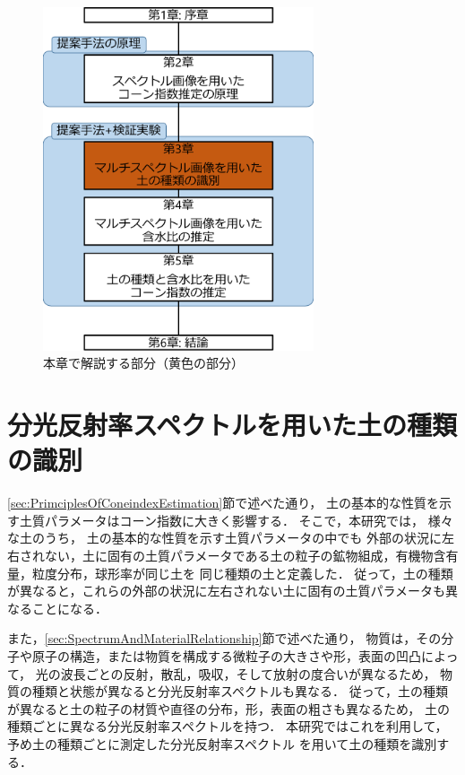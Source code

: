 \begin{figure}[p]
	\begin{center}
	\centering
	\includegraphics[width=8cm]{./Ch3_SoilTypeDiscrimination/Fig/thesis_constitution_ch3_compressed.pdf}
	\caption{本章で解説する部分（黄色の部分）}\label{fig:thesis_constitution_ch3}
	\end{center}
\end{figure}


\clearpage


%
\section{分光反射率スペクトルを用いた土の種類の識別}
\label{sec:SoilTypeDiscriminationFromSpectrum}

\ref{sec:PrimciplesOfConeindexEstimation}節で述べた通り，
土の基本的な性質を示す土質パラメータはコーン指数に大きく影響する．
そこで，本研究では，
様々な土のうち，
土の基本的な性質を示す土質パラメータの中でも
外部の状況に左右されない，土に固有の土質パラメータである土の粒子の鉱物組成，有機物含有量，粒度分布，球形率が同じ土を
同じ種類の土と定義した．
従って，土の種類が異なると，これらの外部の状況に左右されない土に固有の土質パラメータも異なることになる．

また，\ref{sec:SpectrumAndMaterialRelationship}節で述べた通り，
物質は，その分子や原子の構造，または物質を構成する微粒子の大きさや形，表面の凹凸によって，
光の波長ごとの反射，散乱，吸収，そして放射の度合いが異なるため，
物質の種類と状態が異なると分光反射率スペクトルも異なる．
従って，土の種類が異なると土の粒子の材質や直径の分布，形，表面の粗さも異なるため，
土の種類ごとに異なる分光反射率スペクトルを持つ．
本研究ではこれを利用して，
予め土の種類ごとに測定した分光反射率スペクトル
を用いて土の種類を識別する．

